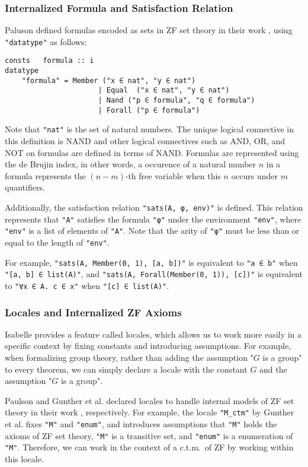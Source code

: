 \documentclass{report}
\newenvironment{isaframe}{\begin{mdframed}[topline=false, rightline=false, bottomline=false]}{\end{mdframed}}
\begin{document}
\subsubsection{Internalized Formula and Satisfaction Relation}
Paluson defined formulas encoded as sets in ZF set theory in their work \cite{paulson_AC_consistency},
using \texttt{"datatype"} as follows:
\begin{isaframe}
\begin{verbatim}
consts   formula :: i
datatype
    "formula" = Member ("x ∈ nat", "y ∈ nat")
                      | Equal  ("x ∈ nat", "y ∈ nat")
                      | Nand ("p ∈ formula", "q ∈ formula")
                      | Forall ("p ∈ formula")
\end{verbatim}
\end{isaframe}
Note that \texttt{"nat"} is the set of natural numbers.
The unique logical connective in this definition is NAND and 
other logical connectives such as AND, OR, and NOT on formulas are defined in terms of NAND.
Formulas are represented using the de Brujin index, in other words, 
a occurence of a natural number $n$ in a formula represents the $(n - m)$-th free variable when this $n$ occurs under $m$ quantifiers.

Additionally, the satisfaction relation \texttt{"sats(A, φ, env)"} is defined.
This relation represents that \texttt{"A"} satisfies the formula \texttt{"φ"} 
under the environment \texttt{"env"}, where \texttt{"env"} is a list of elements of \texttt{"A"}.
Note that the arity of \texttt{"φ"} must be less than or equal to the length of \texttt{"env"}.

For example, \texttt{"sats(A, Member(0, 1), [a, b])"} is equivalent to \texttt{"a ∈ b"} when \texttt{"[a, b] ∈ list(A)"}, 
and \texttt{"sats(A, Forall(Member(0, 1)), [c])"} is equivalent to \texttt{"∀x ∈ A. c ∈ x"} when \texttt{"[c] ∈ list(A)"}.

\subsubsection{Locales and Internalized ZF Axioms}
Isabelle provides a feature called locales, 
which allows us to work more easily in a specific context by fixing constants and introducing assumptions.
For example, when formalizing group theory, rather than adding the assumption "$G$ is a group" to every theorem,
we can simply declare a locale with the constant $G$ and the assumption "$G$ is a group".
 
Paulson and Gunther et al. declared locales to handle internal models of ZF set theory in their work \cite{paulson_AC_consistency, gunther_forcing}, respectively.
For example, the locale \texttt{"M\_ctm"} by Gunther et al. fixes \texttt{"M"} and \texttt{"enum"},
and introduces assumptions that \texttt{"M"} holds the axioms of ZF set theory, 
\texttt{"M"} is a transitive set, and \texttt{"enum"} is a enumeration of \texttt{"M"}.
Therefore, we can work in the context of a c.t.m.\  of ZF by working within this locale.
\end{document}
